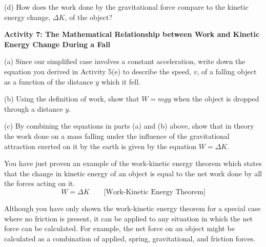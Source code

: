 (d) How does the work done by the gravitational force compare to the kinetic
energy change, \( \Delta  K\), of the object?
\answerspace{20mm}

\pagebreak[2]

\textbf{Activity 7: The Mathematical Relationship between Work and Kinetic Energy
Change During a Fall }

(a) Since our simplified case involves a constant acceleration, write down the
equation you derived in Activity 5(e) to describe the speed, $v$, of a falling
object as a function of the distance $y$ which it fell.
\vspace{10mm}

(b) Using the definition of work, show that $W = mgy$ when the object is dropped
through a distance $y$.
\vspace{20mm}

(c) By combining the equations in parts (a) and (b) above, show that in theory
the work done on a mass falling under the influence of the gravitational attraction
exerted on it by the earth is given by the equation \(W = \Delta  K\).
\vspace{20mm}

You have just proven an example of the work-kinetic energy theorem which 
states that the change in kinetic energy of an object is equal to the net work 
done by all the forces acting on it.
\[
W=\Delta K\qquad \mbox{[Work-Kinetic Energy Theorem]}\]


Although you have only shown the work-kinetic energy theorem for a special 
case where no friction is present, it can be applied to any situation in which 
the net force can be calculated. For example, the net force on an object might 
be calculated as a combination of applied, spring, gravitational, and friction 
forces.

